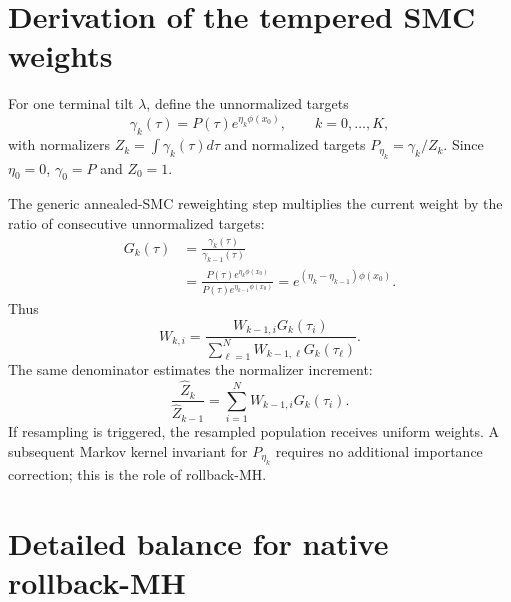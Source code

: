 \documentclass{article}
\begin{document}
\section{Derivation of the tempered SMC weights}
\label{app:weights}

For one terminal tilt $\lambda$, define the unnormalized targets
\begin{equation}
\gamma_k(\tau)=P(\tau)e^{\eta_k\phi(x_0)},
\qquad k=0,\ldots,K,
\end{equation}
with normalizers $Z_k=\int\gamma_k(\tau)d\tau$ and normalized targets
$P_{\eta_k}=\gamma_k/Z_k$. Since $\eta_0=0$, $\gamma_0=P$ and $Z_0=1$.

The generic annealed-SMC reweighting step multiplies the current weight by the
ratio of consecutive unnormalized targets:
\begin{align}
G_k(\tau)
&=\frac{\gamma_k(\tau)}{\gamma_{k-1}(\tau)} \\
&=\frac{P(\tau)e^{\eta_k\phi(x_0)}}
{P(\tau)e^{\eta_{k-1}\phi(x_0)}}
=e^{(\eta_k-\eta_{k-1})\phi(x_0)}.
\end{align}
Thus
\begin{equation}
W_{k,i}
=\frac{W_{k-1,i}G_k(\tau_i)}
{\sum_{\ell=1}^{N}W_{k-1,\ell}G_k(\tau_\ell)}.
\end{equation}
The same denominator estimates the normalizer increment:
\begin{equation}
\frac{\widehat Z_k}{\widehat Z_{k-1}}
=\sum_{i=1}^{N}W_{k-1,i}G_k(\tau_i).
\end{equation}
If resampling is triggered, the resampled population receives uniform weights.
A subsequent Markov kernel invariant for $P_{\eta_k}$ requires no additional
importance correction; this is the role of rollback-MH.

\section{Detailed balance for native rollback-MH}
\label{app:rollback}
\end{document}
